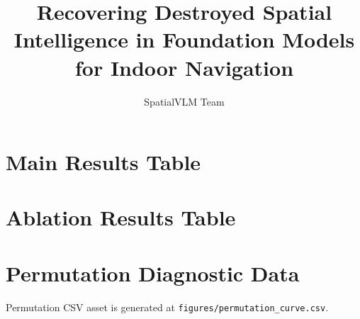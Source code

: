 \documentclass[11pt]{article}
\title{Recovering Destroyed Spatial Intelligence in Foundation Models for Indoor Navigation}
\author{SpatialVLM Team}
\date{}
\begin{document}
\maketitle

\begin{abstract}

\end{abstract}







\section*{Main Results Table}


\section*{Ablation Results Table}


\section*{Permutation Diagnostic Data}
Permutation CSV asset is generated at \texttt{figures/permutation\_curve.csv}.



\end{document}
